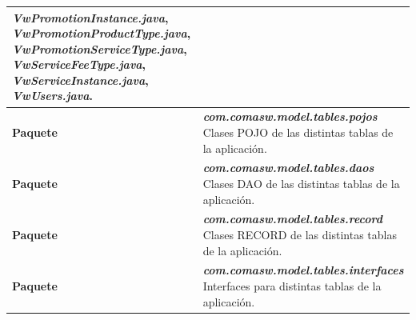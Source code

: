 \begin{longtable}{m{3cm} m{12cm}}
\textit{VwPromotionInstance.java}, 
\textit{VwPromotionProductType.java}, 
\textit{VwPromotionServiceType.java}, 
\textit{VwServiceFeeType.java}, 
\textit{VwServiceInstance.java}, 
\textit{VwUsers.java}.
 \\\hline
	\textbf{Paquete} & \textit{\textbf{com.comasw.model.tables.pojos}}\newline
	Clases POJO de las distintas tablas de la aplicación.
\\\hline
	\textbf{Paquete} & \textit{\textbf{com.comasw.model.tables.daos}}\newline
	Clases DAO de las distintas tablas de la aplicación.
\\\hline
	\textbf{Paquete} & \textit{\textbf{com.comasw.model.tables.record}}\newline
	Clases RECORD de las distintas tablas de la aplicación.
\\\hline
	\textbf{Paquete} & \textit{\textbf{com.comasw.model.tables.interfaces}}\newline
	Interfaces para distintas tablas de la aplicación.
\\\hline

\end{longtable}    